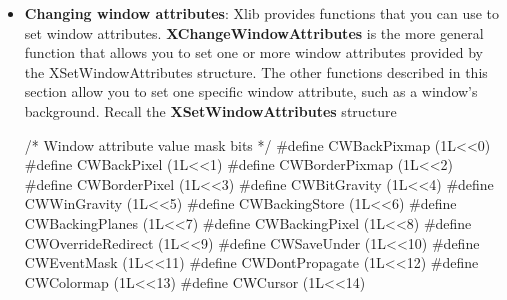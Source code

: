 \documentclass{report}
\begin{document}
\begin{itemize}
            \bigbreak \noindent 
            If the override-redirect attribute of a window is False and some other client has selected \textbf{SubstructureRedirectMask} on the parent, the X server generates \textbf{ConfigureRequest} events for each window whose override-redirect flag is not set, and no further processing is performed. Otherwise, the windows will be restacked in top-to-bottom order.
            \bigbreak \noindent 
            \textbf{XRestackWindows} can generate a \textbf{BadWindow} error.
            \bigbreak \noindent 
        \item \textbf{Changing window attributes}: Xlib provides functions that you can use to set window attributes. \textbf{XChangeWindowAttributes} is the more general function that allows you to set one or more window attributes provided by the XSetWindowAttributes structure. The other functions described in this section allow you to set one specific window attribute, such as a window’s background.
            \bigbreak \noindent 
            Recall the \textbf{XSetWindowAttributes} structure
            \bigbreak \noindent 
            \begin{cppcode}
                /* Window attribute value mask bits */
                #define CWBackPixmap        (1L<<0)
                #define CWBackPixel         (1L<<1)
                #define CWBorderPixmap      (1L<<2)
                #define CWBorderPixel       (1L<<3)
                #define CWBitGravity        (1L<<4)
                #define CWWinGravity        (1L<<5)
                #define CWBackingStore      (1L<<6)
                #define CWBackingPlanes     (1L<<7)
                #define CWBackingPixel      (1L<<8)
                #define CWOverrideRedirect  (1L<<9)
                #define CWSaveUnder         (1L<<10)
                #define CWEventMask         (1L<<11)
                #define CWDontPropagate     (1L<<12)
                #define CWColormap          (1L<<13)
                #define CWCursor            (1L<<14)


\end{cppcode}
\end{itemize}
\end{document}
